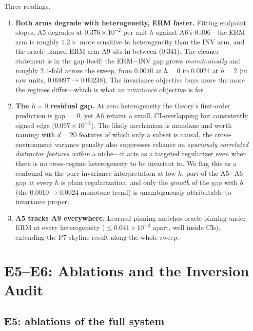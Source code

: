 Three readings.

\begin{enumerate}
\item \textbf{Both arms degrade with heterogeneity, ERM faster.} Fitting
endpoint slopes, A5 degrades at $0.376 \times 10^{-2}$ per unit $h$ against
A6's $0.306$---the ERM arm is roughly $1.2\times$ more sensitive to
heterogeneity than the INV arm, and the oracle-pinned ERM arm A9 sits in
between ($0.341$). The cleaner statement is in the gap itself: the
ERM$-$INV gap grows \emph{monotonically} and roughly $2.4$-fold across the
sweep, from $0.0010$ at $h = 0$ to $0.0024$ at $h = 2$
(in raw units, $0.00097 \to 0.00238$). The invariance objective buys more
the more the regimes differ---which is what an invariance objective is for.
\item \textbf{The $h = 0$ residual gap.} At zero heterogeneity the theory's
first-order prediction is gap $= 0$, yet A6 retains a small, CI-overlapping
but consistently signed edge ($0.097 \times 10^{-2}$). The likely mechanism
is mundane and worth naming: with $d = 20$ features of which only a subset
is causal, the cross-environment variance penalty also suppresses reliance
on \emph{spuriously correlated distractor features within} a niche---it
acts as a targeted regularizer even when there is no cross-regime
heterogeneity to be invariant to. We flag this as a confound on the pure
invariance interpretation at low $h$: part of the A5$-$A6 gap at every $h$
is plain regularization, and only the \emph{growth} of the gap with $h$
(the $0.0010 \to 0.0024$ monotone trend) is unambiguously attributable to
invariance proper.
\item \textbf{A5 tracks A9 everywhere.} Learned pinning matches
oracle pinning under ERM at every heterogeneity ($\le 0.041 \times 10^{-2}$
apart, well inside CIs), extending the P7 skyline result along the whole
sweep.
\end{enumerate}

\section{E5--E6: Ablations and the Inversion Audit}
\label{sec:dd5-e5e6}

\subsection{E5: ablations of the full system}
\label{sec:dd5-e5}

